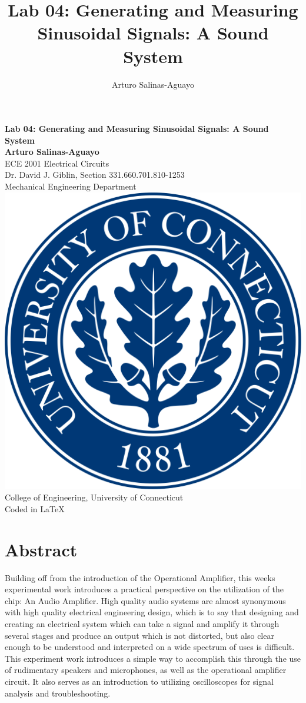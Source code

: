 \documentclass[12pt]{article}
\author{Arturo Salinas-Aguayo}
\title{Lab 04: Generating and Measuring Sinusoidal Signals: A Sound System}
\begin{document}
\newcommand{\closure}[2][3]{%
	{}\mkern#1mu\overline{\mkern-#1mu#2}}
\newcommand\ncoverline[1]{\mkern1mu\overline{\mkern-1mu#1\mkern-1mu}\mkern1mu}
\begin{titlepage}
	\centering
	\vspace*{3cm}
	\huge\textbf{Lab 04: Generating and Measuring Sinusoidal Signals: A Sound System}\\
	\vspace{5cm}
	\Large\textbf{Arturo Salinas-Aguayo}\\
	\normalsize
	ECE 2001 Electrical Circuits\\
	Dr. David J. Giblin, Section 331.660.701.810-1253\\
	Mechanical Engineering Department
	\vfill
	\includegraphics[scale=0.1]{uconnlogo}\\
	College of Engineering, University of Connecticut\\
	\scriptsize{Coded in \LaTeX}
	\vspace*{1cm}
\end{titlepage}
\tableofcontents
\newpage
\section{Abstract}
Building off from the introduction of the Operational Amplifier, this weeks
experimental work introduces a practical perspective on the utilization of the
chip: An Audio Amplifier. High quality audio systems are almost synonymous with
high quality electrical engineering design, which is to say that designing and
creating an electrical system which can take a signal and amplify it through
several stages and produce an output which is not distorted, but also clear
enough to be understood and interpreted on a wide spectrum of uses is
difficult. This experiment work introduces a simple way to accomplish this
through the use of rudimentary speakers and microphones, as well as the
operational amplifier circuit. It also serves as an introduction to utilizing
oscilloscopes for signal analysis and troubleshooting.
\newpage
\end{document}

